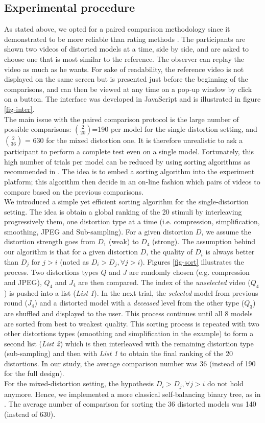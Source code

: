 \subsection{Experimental procedure}
As stated above, we opted for a paired comparison methodology since it demonstrated to be more reliable than rating methods \cite{Mantiuk2012}. The participants are shown two videos of distorted models at a time, side by side, and are asked to choose one that is most similar to the reference. The observer can replay the video as much as he wants. For sake of readability, the reference video is not displayed on the same screen but is presented just before the beginning of the comparisons, and can then be viewed at any time on a pop-up window by click on a button. The interface was developed in JavaScript and is illustrated in figure \ref{fig-inter}.\\
The main issue with the paired comparison protocol is the large number of possible comparisons: $\binom{2}{20}$=190 per model for the single distortion setting, and $\binom{2}{36}$ = 630 for the mixed distortion one. It is therefore unrealistic to ask a participant to perform a complete test even on a single model. Fortunately, this high number of trials per model can be reduced by using sorting algorithms as recommended in \cite{Silverstein2001,Mantiuk2012}. The idea is to embed a sorting algorithm into the experiment platform; this algorithm then decide in an on-line fashion which pairs of videos to compare based on the previous comparisons.\\
We introduced a simple yet efficient sorting algorithm for the single-distortion setting. The idea is obtain a global ranking of the 20 stimuli by interleaving progressively them, one distortion type at a time (i.e. compression, simplification, smoothing, JPEG and Sub-sampling). For a given distortion $D$, we assume the distortion strength goes from $D_1$ (weak) to $D_4$ (strong). The assumption behind our algorithm is that for a given distortion $D$, the quality of $D_i$ is always better than $D_j$ for $j>i$ (noted as $D_i>D_j, \forall j>i$). Figures \ref{fig-sort} illustrates the process. Two distortions types $Q$ and $J$ are randomly chosen (e.g. compression and JPEG), $Q_4$ and $J_4$ are then compared. The index of the \textit{unselected} video ($Q_4$) is pushed into a list (\textit{List 1}). In the next trial, the \textit{selected} model from previous round ($J_4$) and a distorted model with a \textit{deceased} level from the other type ($Q_3$) are shuffled and displayed to the user. This process continues until all 8 models are sorted from best to weakest quality. This sorting process is repeated with two other distortions types (smoothing and simplification in the example) to form a second list (\textit{List 2}) which is then interleaved with the remaining distortion type (sub-sampling) and then with \textit{List 1} to obtain the final ranking of the 20 distortions. In our study, the average comparison number was 36 (instead of 190 for the full design).\\
For the mixed-distortion setting, the hypothesis $D_i>D_j, \forall j>i$ do not hold anymore. Hence, we implemented a more classical self-balancing binary tree, as in \cite{Mantiuk2012}. The average number of comparison for sorting the 36 distorted models was 140 (instead of 630). 
